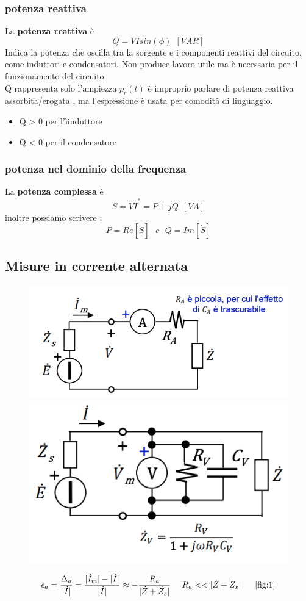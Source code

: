 \documentclass{article}
\theoremstyle{definition}
\begin{document}
\subsubsection{potenza reattiva}
La \textbf{potenza reattiva } è $$Q=VIsin(\phi)\ \ [VAR]$$
Indica la potenza che oscilla tra la sorgente e i componenti reattivi del circuito, come induttori e condensatori. Non produce lavoro utile ma è necessaria per il funzionamento del circuito.\\
Q rappresenta solo l'ampiezza $p_r(t)$ è improprio parlare di potenza reattiva assorbita/erogata , ma l'espressione è usata per comodità di linguaggio.
\begin{itemize}
	\item Q > 0 per l'ìinduttore 
	\item Q < 0 per il condensatore
\end{itemize}
\subsubsection{potenza nel dominio della frequenza}
La \textbf{potenza complessa} è $$\dot{S}=\dot{V}\dot{I}^*=P+jQ\ \ [VA]$$
inoltre possiamo scrivere :
$$P=Re[\dot{S}] \ \ \ e \ \ \ Q=Im [\dot{S}]$$

\newpage
\subsection{Misure in corrente alternata}
\begin{figure}[h]
\centering
\includegraphics[scale=0.30]{immagini/ampAC}
\label{fig:1}
\hfil
\includegraphics[scale=0.30]{immagini/voltAC}
\label{fig:2}
\end{figure}
$$\epsilon_a=\frac{\Delta_a}{|\dot{I}|}=\frac{|\dot{I}_m|-|\dot{I}|}{|\dot{I}|}\approx -\frac{R_a}{|\dot{Z}+\dot{Z}_s|} \ \ \ \ R_a <<|\dot{Z}+\dot{Z}_s|\ \ \ \ \ \ref{fig:1}$$
\end{document}
